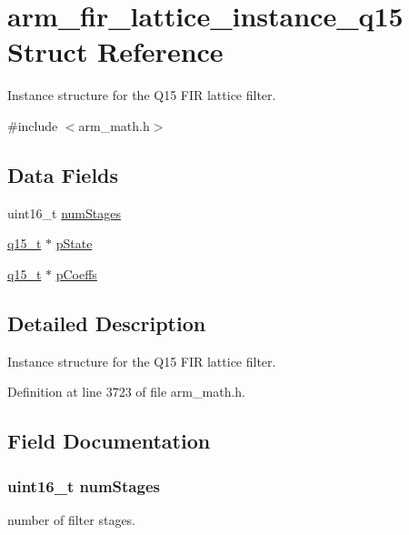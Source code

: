 \hypertarget{structarm__fir__lattice__instance__q15}{}\section{arm\+\_\+fir\+\_\+lattice\+\_\+instance\+\_\+q15 Struct Reference}
\label{structarm__fir__lattice__instance__q15}


Instance structure for the Q15 F\+IR lattice filter.  




{\ttfamily \#include $<$arm\+\_\+math.\+h$>$}

\subsection*{Data Fields}
\begin{DoxyCompactItemize}
\item 
uint16\+\_\+t \hyperlink{structarm__fir__lattice__instance__q15_a4cceb90547b3e585d4c7aabaa8057212}{num\+Stages}
\item 
\hyperlink{arm__math_8h_ab5a8fb21a5b3b983d5f54f31614052ea}{q15\+\_\+t} $\ast$ \hyperlink{structarm__fir__lattice__instance__q15_ae29dfdb736374fcddaeaec4b7770170c}{p\+State}
\item 
\hyperlink{arm__math_8h_ab5a8fb21a5b3b983d5f54f31614052ea}{q15\+\_\+t} $\ast$ \hyperlink{structarm__fir__lattice__instance__q15_a7ca181a37f714d174445f486bebce26f}{p\+Coeffs}
\end{DoxyCompactItemize}


\subsection{Detailed Description}
Instance structure for the Q15 F\+IR lattice filter. 

Definition at line 3723 of file arm\+\_\+math.\+h.



\subsection{Field Documentation}
\subsubsection[{\texorpdfstring{num\+Stages}{numStages}}]{\setlength{\rightskip}{0pt plus 5cm}uint16\+\_\+t num\+Stages}\hypertarget{structarm__fir__lattice__instance__q15_a4cceb90547b3e585d4c7aabaa8057212}{}\label{structarm__fir__lattice__instance__q15_a4cceb90547b3e585d4c7aabaa8057212}
number of filter stages. 

